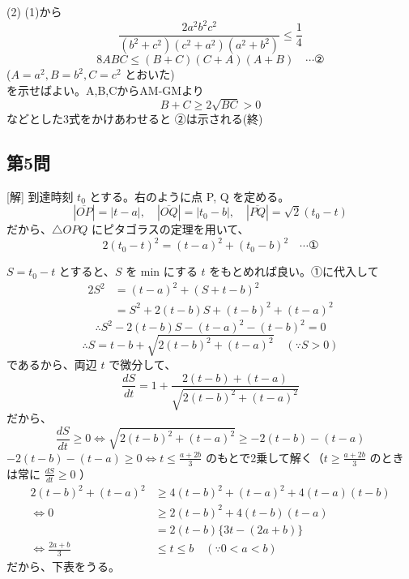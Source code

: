 \documentclass[../main.tex]{subfiles}
\begin{document}
(2) (1)から
\[ \frac{2a^2b^2c^2}{(b^2+c^2)(c^2+a^2)(a^2+b^2)} \le \frac{1}{4} \]
\[ 8ABC \le (B+C)(C+A)(A+B) \quad \cdots \text{②} \]
($A=a^2, B=b^2, C=c^2$ とおいた)\\
を示せばよい。A,B,CからAM-GMより
\[ B+C \ge 2\sqrt{BC} > 0 \]
などとした3式をかけあわせると ②は示される(終)

\subsection*{第5問}
[解] 到達時刻 $t_0$ とする。右のように点 P, Q を定める。
\[ |\overline{OP}| = |t-a|, \quad |\overline{OQ}| = |t_0-b|, \quad |\overline{PQ}| = \sqrt{2}(t_0-t) \]
だから、$\triangle OPQ$ にピタゴラスの定理を用いて、
\[ 2(t_0-t)^2 = (t-a)^2 + (t_0-b)^2 \quad \cdots \text{①} \]


$S = t_0 - t$ とすると、$S$ を min にする $t$ をもとめれば良い。①に代入して
\begin{align*}
  2 S^2 &= (t-a)^2 + (S + t - b)^2 \\
  &= S^2 + 2(t-b)S + (t-b)^2 + (t-a)^2
\end{align*}
\[ \therefore S^2 - 2(t-b)S - (t-a)^2 - (t-b)^2 = 0 \]
\[ \therefore S = t-b + \sqrt{2(t-b)^2 + (t-a)^2} \quad (\because S > 0) \]
であるから、両辺 $t$ で微分して、
\[ \frac{dS}{dt} = 1 + \frac{2(t-b) + (t-a)}{\sqrt{2(t-b)^2 + (t-a)^2}} \]
だから、
\[ \frac{dS}{dt} \ge 0 \iff \sqrt{2(t-b)^2 + (t-a)^2} \ge -2(t-b) - (t-a) \]
$-2(t-b) - (t-a) \ge 0 \iff t \le \frac{a+2b}{3}$ のもとで2乗して解く（$t \ge \frac{a+2b}{3}$ のときは常に $\frac{dS}{dt} \ge 0$ ）
\begin{align*}
  2(t-b)^2 + (t-a)^2 &\ge 4(t-b)^2 + (t-a)^2 + 4(t-a)(t-b) \\
  \iff 0 &\ge 2(t-b)^2 + 4(t-b)(t-a) \\
  &= 2(t-b) \{ 3t - (2a+b) \} \\
  \iff \frac{2a+b}{3} &\le t \le b \quad (\because 0 < a < b)
\end{align*}
だから、下表をうる。
\end{document}
